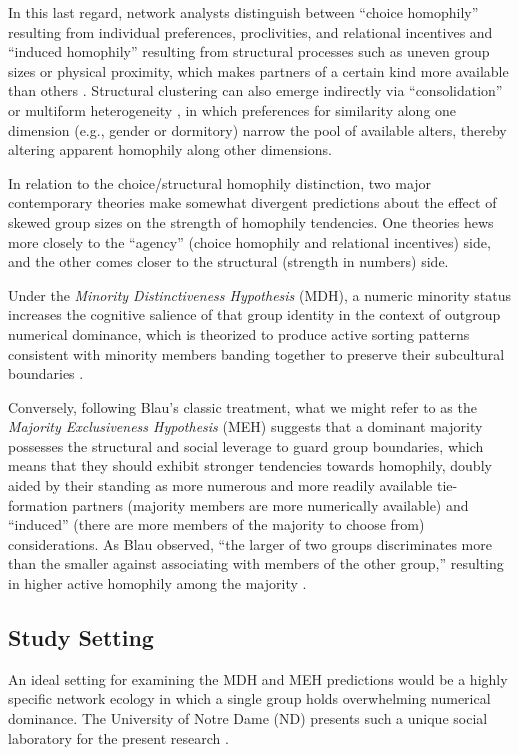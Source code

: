 \documentclass[11pt]{article}
\begin{document}
In this last regard, network analysts distinguish between ``choice homophily'' resulting from individual preferences, proclivities, and relational incentives and ``induced homophily'' resulting from structural processes such as uneven group sizes or physical proximity, which makes partners of a certain kind more available than others \citep{kossinets2009, mcpherson2001, marsden1988, hofstra2017sources-be0}. Structural clustering can also emerge indirectly via ``consolidation'' or multiform heterogeneity \citep{blau1977book}, in which preferences for similarity along one dimension (e.g., gender or dormitory) narrow the pool of available alters, thereby altering apparent homophily along other dimensions. 

In relation to the choice/structural homophily distinction, two major contemporary theories make somewhat divergent predictions about the effect of skewed group sizes on the strength of homophily tendencies. One theories hews more closely to the ``agency'' (choice homophily and relational incentives) side, and the other comes closer to the structural (strength in numbers) side. 

Under the \emph{Minority Distinctiveness Hypothesis} (MDH), a numeric minority status increases the cognitive salience of that group identity in the context of outgroup numerical dominance, which is theorized to produce active sorting patterns consistent with minority members banding together to preserve their subcultural boundaries \citep{mehra1998, leonard2008, marsden1988, sepulvado2015}. 

Conversely, following Blau's classic treatment, what we might refer to as the \emph{Majority Exclusiveness Hypothesis} (MEH) suggests that a dominant majority possesses the structural and social leverage to guard group boundaries, which means that they should exhibit stronger tendencies towards homophily, doubly aided by their standing as more numerous and more readily available tie-formation partners (majority members are more numerically available) and ``induced'' (there are more members of the majority to choose from) considerations. As Blau observed, ``the larger of two groups discriminates more than the smaller against associating with members of the other group,'' resulting in higher active homophily among the majority \citep[p.~81]{blau1977book}.

\subsection{Study Setting}
An ideal setting for examining the MDH and MEH predictions would be a highly specific network ecology in which a single group holds overwhelming numerical dominance. The University of Notre Dame (ND) presents such a unique social laboratory for the present research \citep{hachen2022generators-923}. 
\end{document}
